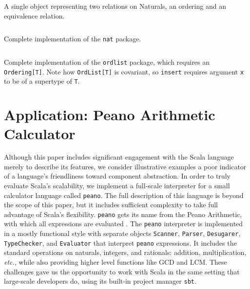 \documentclass[jou,apacite]{IEEEtran}
\begin{document}
\begin{listing}
\inputminted[frame=single, firstline=5]{Scala}{../examples/MixinExample.scala}
\caption{A single object representing two relations on Naturals, an ordering and
an equivalence relation.}
\label{lst:mixin}
\end{listing}

\begin{listing*}[p]
  \inputminted[frame=single, fontsize=\scriptsize, linenos=true]
  {Scala}{../examples/Nat.scala}
  \caption{Complete implementation of the \texttt{nat} package.}
  \label{lst:nat-full}
\end{listing*}

\begin{listing*}[p]
  \inputminted[frame=single, fontsize=\scriptsize, linenos=true]
  {Scala}{../examples/OrdList.scala}
  \caption{Complete implementation of the \texttt{ordlist} package, which
    requires an \texttt{Ordering[T]}. Note how \texttt{OrdList[T]} is covariant,
    so \texttt{insert} requires argument \texttt{x} to be of a supertype of
    \texttt{T}.}
  \label{lst:ordlist-full}
\end{listing*}

\section{Application: Peano Arithmetic Calculator}
\label{sec:appl-peano-arithm}

Although this paper includes significant engagement with the Scala language
merely to describe its features, we consider illustrative examples a poor
indicator of a language's friendliness toward component abstraction. In order to
truly evaluate Scala's scalability, we implement a full-scale interpreter for a
small calculator language called \texttt{peano}. The full description of this
language is beyond the scope of this paper, but it includes sufficient
complexity to take full advantage of Scala's flexibility. \texttt{peano} gets
its name from the Peano Arithmetic, with which all expressions are evaluated
\cite{grassmann_lehrbuch_1861}. The \texttt{peano} interpreter is implemented in
a mostly functional style with separate objects \texttt{Scanner},
\texttt{Parser}, \texttt{Desugarer}, \texttt{TypeChecker}, and
\texttt{Evaluator} that interpret \texttt{peano} expressions. It includes the
standard operations on naturals, integers, and rationals: addition,
multiplication, \emph{etc.}, while also providing higher level functions like
GCD and LCM. These challenges gave us the opportunity to work with Scala in the
same setting that large-scale developers do, using its built-in project manager
\texttt{sbt}.
\end{document}
